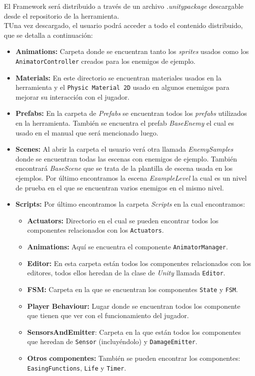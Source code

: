 El Framework será distribuido a través de un archivo \textit{.unitypackage} descargable desde el repositorio de la herramienta.\\

TUna vez descargado, el usuario podrá acceder a todo el contenido distribuido, que se detalla a continuación:\\
\begin{itemize}
\item \textbf{Animations:} Carpeta donde se encuentran tanto los \textit{sprites} usados como los \texttt{AnimatorController} creados para los enemigos de ejemplo.
\item \textbf{Materials:} En este directorio se encuentran materiales usados en la herramienta y el \texttt{Physic Material 2D} usado en algunos enemigos para mejorar su interacción con el jugador.
\item \textbf{Prefabs:} En la carpeta de \textit{Prefabs} se encuentran todos los \textit{prefabs} utilizados en la herramienta. También se encuentra el prefab \textit{BaseEnemy} el cual es usado en el manual que será mencionado luego.
\item \textbf{Scenes:} Al abrir la carpeta el usuario verá otra llamada \textit{EnemySamples} donde se encuentran todas las escenas con enemigos de ejemplo. También encontrará \textit{BaseScene} que se trata de la plantilla de escena usada en los ejemplos. Por último encontramos la escena \textit{ExampleLevel} la cual es un nivel de prueba en el que se encuentran varios enemigos en el mismo nivel.
\item \textbf{Scripts:} Por último encontramos la carpeta \textit{Scripts} en la cual encontramos:
	\begin{itemize}
	\item \textbf{Actuators:} Directorio en el cual se pueden encontrar todos los componentes relacionados con los \texttt{Actuators}.
	\item \textbf{Animations:} Aquí se encuentra el componente \texttt{AnimatorManager}.
	\item \textbf{Editor:} En esta carpeta están todos los componentes relacionados con los editores, todos ellos heredan de la clase de \textit{Unity} llamada \texttt{Editor}.
	\item \textbf{FSM:} Carpeta en la que se encuentran los componentes \texttt{State} y \texttt{FSM}.
	\item \textbf{Player Behaviour:} Lugar donde se encuentran todos los componente que tienen que ver con el funcionamiento del jugador.
	\item \textbf{SensorsAndEmitter}: Carpeta en la que están todos los componentes que heredan de \texttt{Sensor} (incluyéndolo) y \texttt{DamageEmitter}.
	\item \textbf{Otros componentes:} También se pueden encontrar los componentes: \texttt{EasingFunctions}, \texttt{Life} y \texttt{Timer}.
	\end{itemize}
\end{itemize}

